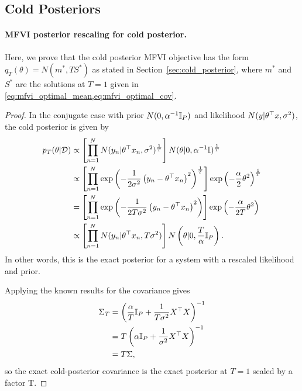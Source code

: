 \subsection{Cold Posteriors}
\label{ap:cold-posterior-proofs}

\paragraph{MFVI posterior rescaling for cold posterior.} Here, we prove that the cold posterior MFVI objective has the form $q_T(\theta) = N(m^*, T S^*)$ as stated in Section~\ref{sec:cold_posterior}, where $m^*$ and $S^*$ are the solutions at $T=1$ given in \cref{eq:mfvi_optimal_mean,eq:mfvi_optimal_cov}. 

\begin{proof}
    In the conjugate case with prior $N(0, \alpha^{-1} \mathbb{I}_P)$ and likelihood $N(y|\theta^\top  x, \sigma^2) $, the cold posterior is given by 
    \begin{align}
        p_T(\theta|\mathcal{D}) & \propto \left[\prod_{n=1}^N N(y_n | \theta^\top x_n, \sigma^2) ^{\frac{1}{T}} \right] N(\theta| 0, \alpha^{-1} \mathbb{I})^{\frac{1}{T}}
        \\ &\propto \left[\prod_{n=1}^N \exp\left(-\frac{1}{2\sigma^2} \left(y_n - \theta^\top x_n\right)^2 \right) ^{\frac{1}{T}} \right] \exp\left(-\frac{\alpha}{2} \theta^2 \right) ^{\frac{1}{T}}
        \\ &= \left[\prod_{n=1}^N \exp\left(-\frac{1}{2 T \sigma^2} \left(y_n - \theta^\top x_n\right)^2 \right)  \right] \exp\left(-\frac{\alpha}{2T } \theta^2 \right) 
        \\ & \propto \left[\prod_{n=1}^N N(y_n | \theta^\top x_n, T \sigma^2) \right] N\left(\theta| 0, \frac{T}{\alpha} \mathbb{I}_P\right). 
    \end{align}
    In other words, this is the exact posterior for a system with a rescaled likelihood and prior. 
    
    Applying the known results for the covariance gives
    \begin{equation}
    \begin{split}
        \Sigma_T &= \left(\frac{\alpha}{T } \mathbb{I}_P + \frac{1}{T \sigma^2} X^\top X \right)^{-1}
        \\ & = T \left(\alpha \mathbb{I}_P + \frac{1}{ \sigma^2} X^\top X \right)^{-1}
        \\ & = T \Sigma,
    \end{split}
    \end{equation}
    so the exact cold-posterior covariance is the exact posterior at $T=1$ scaled by a factor T. 


\end{proof}
